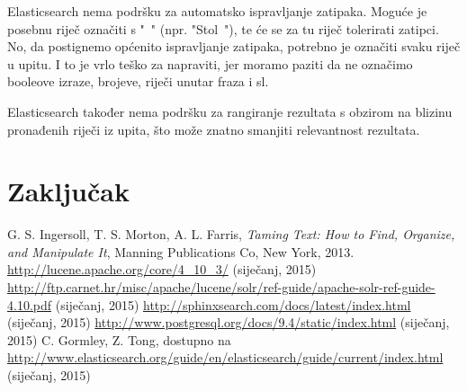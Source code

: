 \documentclass[a4paper,twoside,12pt]{scrreprt}
\begin{document}
Elasticsearch nema podršku za automatsko ispravljanje zatipaka. Moguće je posebnu riječ označiti s "~" (npr. "Stol~"), te će se za tu riječ tolerirati zatipci. No, da postignemo općenito ispravljanje zatipaka, potrebno je označiti svaku riječ u upitu. I to je vrlo teško za napraviti, jer moramo paziti da ne označimo booleove izraze, brojeve, riječi unutar fraza i sl.

Elasticsearch također nema podršku za rangiranje rezultata s obzirom na blizinu pronađenih riječi iz upita, što može znatno smanjiti relevantnost rezultata.

\chapter{Zaključak}

\begin{thebibliography}{99}
   G. S. Ingersoll, T. S. Morton, A. L. Farris, \textit{Taming Text: How to Find, Organize, and Manipulate It}, Manning Publications Co, New York, 2013.
   \url{http://lucene.apache.org/core/4_10_3/} (siječanj, 2015)
   \url{http://ftp.carnet.hr/misc/apache/lucene/solr/ref-guide/apache-solr-ref-guide-4.10.pdf} (siječanj, 2015)
   \url{http://sphinxsearch.com/docs/latest/index.html} (siječanj, 2015)
   \url{http://www.postgresql.org/docs/9.4/static/index.html} (siječanj, 2015)
   C. Gormley, Z. Tong, dostupno na \url{http://www.elasticsearch.org/guide/en/elasticsearch/guide/current/index.html} (siječanj, 2015)
\end{thebibliography}

\pagestyle{empty}

\begin{sazetak}
\end{sazetak}

\begin{summary}
\end{summary}

\begin{cv}
\end{cv}
\end{document}
